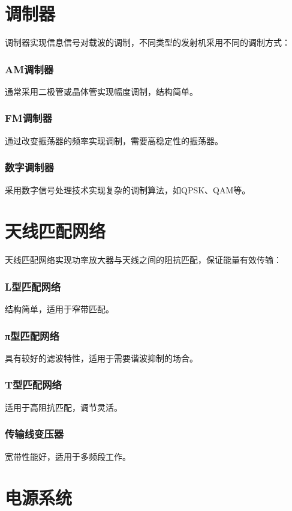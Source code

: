 \documentclass[12pt,UTF8]{ctexbook}
\begin{document}
\section{调制器}

调制器实现信息信号对载波的调制，不同类型的发射机采用不同的调制方式：

\subsubsection{AM调制器}
通常采用二极管或晶体管实现幅度调制，结构简单。

\subsubsection{FM调制器}
通过改变振荡器的频率实现调制，需要高稳定性的振荡器。

\subsubsection{数字调制器}
采用数字信号处理技术实现复杂的调制算法，如QPSK、QAM等。

\section{天线匹配网络}

天线匹配网络实现功率放大器与天线之间的阻抗匹配，保证能量有效传输：

\subsubsection{L型匹配网络}
结构简单，适用于窄带匹配。

\subsubsection{π型匹配网络}
具有较好的滤波特性，适用于需要谐波抑制的场合。

\subsubsection{T型匹配网络}
适用于高阻抗匹配，调节灵活。

\subsubsection{传输线变压器}
宽带性能好，适用于多频段工作。

\section{电源系统}
\end{document}
